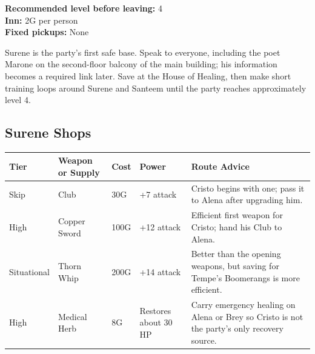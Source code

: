 \documentclass[
  american,
  10pt,
  letterpaper,
  oneside,
  open=any]{scrreprt}
\newcounter{none} %
\newenvironment{guidetable}{%
  \small\setstretch{1.0}%
  \setlength{\tabcolsep}{4pt}%
  \setlength{\LTpre}{8pt}\setlength{\LTpost}{10pt}%
  \renewcommand{\arraystretch}{1.16}%
}{ }
\begin{document}
\textbf{Recommended level before leaving:} 4\\
\textbf{Inn:} 2G per person\\
\textbf{Fixed pickups:} None

Surene is the party's first safe base. Speak to everyone, including the
poet Marone on the second-floor balcony of the main building; his
information becomes a required link later. Save at the House of Healing,
then make short training loops around Surene and Santeem until the party
reaches approximately level 4.

\subsection{Surene Shops}\label{surene-shops}

\begin{guidetable}

{\def\LTcaptype{none} %
\begin{longtable}[]{@{}
  >{\raggedright\arraybackslash}p{}
  >{\raggedright\arraybackslash}p{}
  >{\raggedleft\arraybackslash}p{}
  >{\raggedleft\arraybackslash}p{}
  >{\raggedright\arraybackslash}p{}@{}}
\toprule\noalign{}
\begin{minipage}[b]{\linewidth}\raggedright
\color{GuideGreen}\bfseries Tier
\end{minipage} & \begin{minipage}[b]{\linewidth}\raggedright
\color{GuideGreen}\bfseries Weapon or Supply
\end{minipage} & \begin{minipage}[b]{\linewidth}\raggedleft
\color{GuideGreen}\bfseries Cost
\end{minipage} & \begin{minipage}[b]{\linewidth}\raggedleft
\color{GuideGreen}\bfseries Power
\end{minipage} & \begin{minipage}[b]{\linewidth}\raggedright
\color{GuideGreen}\bfseries Route Advice
\end{minipage} \\
\midrule\noalign{}
\endhead
\bottomrule\noalign{}
\endlastfoot
Skip & Club & 30G & +7 attack & Cristo begins with one; pass it to Alena
after upgrading him. \\
High & Copper Sword & 100G & +12 attack & Efficient first weapon for
Cristo; hand his Club to Alena. \\
Situational & Thorn Whip & 200G & +14 attack & Better than the opening
weapons, but saving for Tempe's Boomerangs is more efficient. \\
High & Medical Herb & 8G & Restores about 30 HP & Carry emergency
healing on Alena or Brey so Cristo is not the party's only recovery
source. \\
\end{longtable}
}

\end{guidetable}
\end{document}
